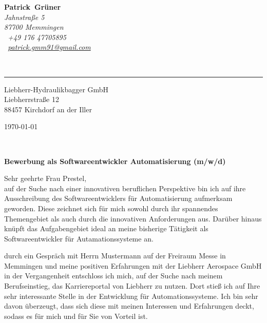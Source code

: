 \documentclass[10pt,a4paper]{article}
\def\firstname{Patrick}
\def\familyname{Grüner}
\begin{document}
\sffamily   %
\hfill%
\begin{minipage}[t]{.6\textwidth}
	\raggedleft%
	{\bfseries {\color{firstnamecolor}\firstname}~{\color{familynamecolor}\familyname}}\\[.35ex]
	\small\itshape%
	Jahnstraße 5\\
	87700 Memmingen\\[.35ex]
	\Mobilefone~+49 176 47705895\\
	\Letter~\href{mailto:patrick.gmm91@gmail.com}{patrick.gmm91@gmail.com}
\end{minipage}\\[0.5em]
%
{\color{firstnamecolor}\rule{\textwidth}{.25ex}}
%
\begin{minipage}[t]{.4\textwidth}
	\raggedright%
	\vspace*{1em}
	Liebherr-Hydraulikbagger GmbH \\[.35ex]
	\small%
	Liebherrstraße 12\\
	88457 Kirchdorf an der Iller
\end{minipage}
%
\hfill
%
\begin{minipage}[t]{.4\textwidth}
	\raggedleft %
	\today
\end{minipage}\\[1em]
\raggedright

{\bfseries \color{familynamecolor}Bewerbung als Softwareentwickler Automatisierung (m/w/d)\\[1.5em]}

Sehr geehrte Frau Prestel,\\[1em]
%
auf der Suche nach einer innovativen beruflichen Perspektive bin ich auf ihre Ausschreibung des Softwareentwicklers für Automatisierung aufmerksam geworden. Diese zeichnet sich für mich sowohl durch ihr spannendes Themengebiet als auch durch die innovativen Anforderungen aus. Darüber hinaus knüpft das Aufgabengebiet ideal an meine bisherige Tätigkeit als Softwareentwickler für Autamationssysteme an.

durch ein Gespräch mit Herrn {\color{red}Mustermann} auf der Freiraum Messe in Memmingen und meine positiven Erfahrungen mit der Liebherr Aerospace GmbH in der Vergangenheit entschloss ich mich, auf der Suche nach meinem Berufseinstieg, das Karriereportal von Liebherr zu nutzen. Dort stieß ich auf Ihre sehr interessante Stelle in der Entwicklung für Automationssysteme. {\color{red}Ich bin sehr davon überzeugt, dass sich diese mit meinen Interessen und Erfahrungen deckt, sodass es für mich und für Sie von Vorteil ist}.      
\end{document}
